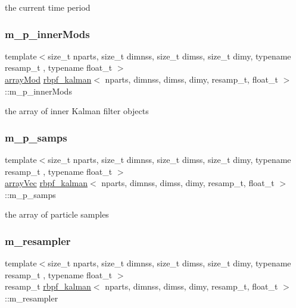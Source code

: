 the current time period \mbox{\label{classrbpf__kalman_ad6ff53f5ea23c35d3c7154b31a50bb34}} 
\subsubsection{\texorpdfstring{m\+\_\+p\+\_\+inner\+Mods}{m\_p\_innerMods}}
{\footnotesize\ttfamily template$<$size\+\_\+t nparts, size\+\_\+t dimnss, size\+\_\+t dimss, size\+\_\+t dimy, typename resamp\+\_\+t , typename float\+\_\+t $>$ \\
\hyperlink{classrbpf__kalman_a99e5cb365f01f83962440f29357744d9}{array\+Mod} \hyperlink{classrbpf__kalman}{rbpf\+\_\+kalman}$<$ nparts, dimnss, dimss, dimy, resamp\+\_\+t, float\+\_\+t $>$\+::m\+\_\+p\+\_\+inner\+Mods\hspace{0.3cm}{\ttfamily [private]}}

the array of inner Kalman filter objects \mbox{\label{classrbpf__kalman_a88f7188c59b2cc1407a14e60051a1840}} 
\subsubsection{\texorpdfstring{m\+\_\+p\+\_\+samps}{m\_p\_samps}}
{\footnotesize\ttfamily template$<$size\+\_\+t nparts, size\+\_\+t dimnss, size\+\_\+t dimss, size\+\_\+t dimy, typename resamp\+\_\+t , typename float\+\_\+t $>$ \\
\hyperlink{classrbpf__kalman_ad0c2ef4db6363157244741517daae136}{array\+Vec} \hyperlink{classrbpf__kalman}{rbpf\+\_\+kalman}$<$ nparts, dimnss, dimss, dimy, resamp\+\_\+t, float\+\_\+t $>$\+::m\+\_\+p\+\_\+samps\hspace{0.3cm}{\ttfamily [private]}}

the array of particle samples \mbox{\label{classrbpf__kalman_a8ecaad1e77a122988843b2a0a33f882d}} 
\subsubsection{\texorpdfstring{m\+\_\+resampler}{m\_resampler}}
{\footnotesize\ttfamily template$<$size\+\_\+t nparts, size\+\_\+t dimnss, size\+\_\+t dimss, size\+\_\+t dimy, typename resamp\+\_\+t , typename float\+\_\+t $>$ \\
resamp\+\_\+t \hyperlink{classrbpf__kalman}{rbpf\+\_\+kalman}$<$ nparts, dimnss, dimss, dimy, resamp\+\_\+t, float\+\_\+t $>$\+::m\+\_\+resampler\hspace{0.3cm}{\ttfamily [private]}}

